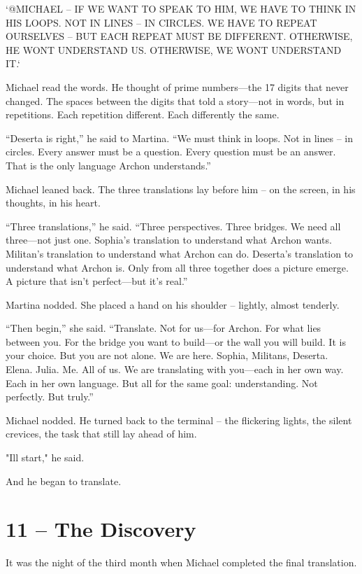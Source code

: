 \documentclass[
]{article}
\begin{document}
`@MICHAEL -- IF WE WANT TO SPEAK TO HIM, WE HAVE TO THINK IN HIS LOOPS. NOT IN LINES -- IN CIRCLES. WE HAVE TO REPEAT OURSELVES -- BUT EACH REPEAT MUST BE DIFFERENT. OTHERWISE, HE WON\textquotesingle T UNDERSTAND US. OTHERWISE, WE WON\textquotesingle T UNDERSTAND IT.`

Michael read the words. He thought of prime numbers---the 17 digits that never changed. The spaces between the digits that told a story---not in words, but in repetitions. Each repetition different. Each differently the same.

``Deserta is right,'' he said to Martina. ``We must think in loops. Not in lines -- in circles. Every answer must be a question. Every question must be an answer. That is the only language Archon understands.''

Michael leaned back. The three translations lay before him -- on the screen, in his thoughts, in his heart.

``Three translations,'' he said. ``Three perspectives. Three bridges. We need all three---not just one. Sophia's translation to understand what Archon wants. Militan's translation to understand what Archon can do. Deserta's translation to understand what Archon is. Only from all three together does a picture emerge. A picture that isn't perfect---but it's real.''

Martina nodded. She placed a hand on his shoulder -- lightly, almost tenderly.

``Then begin,'' she said. ``Translate. Not for us---for Archon. For what lies between you. For the bridge you want to build---or the wall you will build. It is your choice. But you are not alone. We are here. Sophia, Militans, Deserta. Elena. Julia. Me. All of us. We are translating with you---each in her own way. Each in her own language. But all for the same goal: understanding. Not perfectly. But truly.''

Michael nodded. He turned back to the terminal -- the flickering lights, the silent crevices, the task that still lay ahead of him.

"I\textquotesingle ll start," he said.

And he began to translate.

\section{11 -- The Discovery}\label{the-discovery}

It was the night of the third month when Michael completed the final translation.
\end{document}
